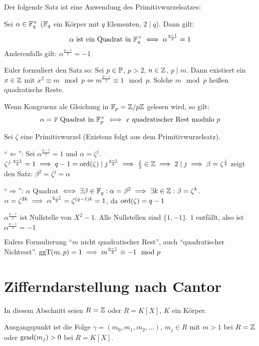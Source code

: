 \documentclass[a4paper,DIV15,BCOR12mm]{article}
\begin{document}
Der folgende Satz ist eine Anwendung des Primitivwurzelsatzes:

\begin{satz}
Sei $\alpha\in\mathbb{F}_q^\times$ ($\mathbb{F}_q$ ein Körper mit $q$ Elementen,
$2\mid q$). Dann gilt:
\[ \alpha \text{ ist ein Quadrat in }\mathbb{F}_q^\times \iff \alpha^{\frac{q-1}{2}} = 1 \]
Anderenfalls gilt: $\alpha^{\frac{q-1}{2}} = -1$

Euler formuliert den Satz so: Sei $p\in\mathbb{P}$, $p>2$, $n\in\mathbb{Z}$,
$p\mid m$. Dann existiert ein $x\in\mathbb{Z}$ mit $x^2 \equiv m \mod p
\iff m^{\frac{p-1}2} \equiv 1 \mod p$. Solche $m\mod p$ heißen
quadratische Reste.

Wenn Kongruenz als Gleichung in $\mathbb{F}_p = \mathbb{Z}/p\mathbb{Z}$ gelesen wird,
so gilt:
\[ \alpha = \overline x \text{ Quadrat in }\mathbb{F}_p^\times \iff x \text{ quadratischer Rest modulo }p \]
\end{satz}

\begin{beweis}
Sei $\zeta$ eine Primitivwurzel (Existenz folgt aus dem
Primitivwurzelsatz).

"`$\Longleftarrow$"': Sei $\alpha^{\frac{q-1}2} = 1$ und $\alpha  =
\zeta ^j$. $\zeta^{j\cdot\frac{q-1}2} = 1 \implies q-1=\mathop{\rm ord}\nolimits(\zeta)\mid
j^{\frac{q-1}2} \implies \frac j 2 \in \mathbb{Z} \implies 2 \mid j \implies
\beta = \zeta^{\frac j 2}$ zeigt den Satz: $\beta^2 = \zeta ^j =
\alpha$

"`$\Longrightarrow$"': $\alpha$ Quadrat $\iff \exists \beta
\in\mathbb{F}_q: \alpha = \beta^2 \implies \exists k\in\mathbb{Z}: \beta =
\zeta^k$. $\alpha= \zeta^{2k} \implies \alpha ^{\frac{q-1}2} = \zeta
^{(q-1)k} = 1$, da $\mathop{\rm ord}\nolimits(\zeta) = q-1$

$\alpha^{\frac {q-1}2}$ ist Nullstelle von $X^2-1$. Alle Nullstellen
sind $\{1,-1\}$. $1$ entfällt, also ist $\alpha^{\frac{q-1}2} = -1$
\end{beweis}

Eulers Formulierung "`$m$ nicht quadratischer Rest"', auch
"`quadratischer Nichtrest"'. $\mathop{\rm ggT}\nolimits(m,p) = 1 \implies m^{\frac{p-1}2}
\equiv -1 \mod p$

\section{Zifferndarstellung nach Cantor}

In diesem Abschnitt seien $R=\mathbb{Z}$ oder $R=K[X]$, $K$ ein Körper.

Ausgangspunkt ist die Folge $\gamma=(m_0,m_1,m_2,\ldots)$, $m_j\in
R$ mit $m>1$ bei $R=\mathbb{Z}$ oder $\mathop{\rm grad}\nolimits(m_j)>0$ bei $R=K[X]$.
\end{document}
